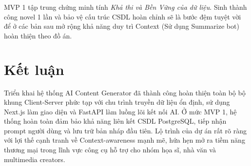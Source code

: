 \documentclass[final]{hcmuitthesis}
\begin{document}
MVP 1 tập trung chứng minh tính \textit{Khả thi và Bền Vững của dữ liệu}. Sinh thành công novel 1 lần và bảo vệ cấu trúc CSDL hoàn chỉnh sẽ là bước đệm tuyệt vời để ở các bản sau mở rộng khả năng duy trì Context (Sử dụng Summarize bot) hoàn thiện theo đồ án.


\chapter{Kết luận}
Triển khai hệ thống AI Content Generator đã thành công hoàn thiện toàn bộ bộ khung Client-Server phức tạp với chu trình truyền dữ liệu ổn định, sử dụng Next.js làm giao diện và FastAPI làm luồng lõi kết nối AI. Ở mức MVP 1, hệ thống hoàn toàn đảm bảo khả năng liên kết CSDL PostgreSQL, tiếp nhận prompt người dùng và lưu trữ bản nháp đầu tiên. Lộ trình của dự án rất rõ ràng với lợi thế cạnh tranh về Context-awareness mạnh mẽ, hứa hẹn mở ra tiềm năng thương mại trong lĩnh vực công cụ hỗ trợ cho nhóm họa sĩ, nhà văn và multimedia creators.
\end{document}
